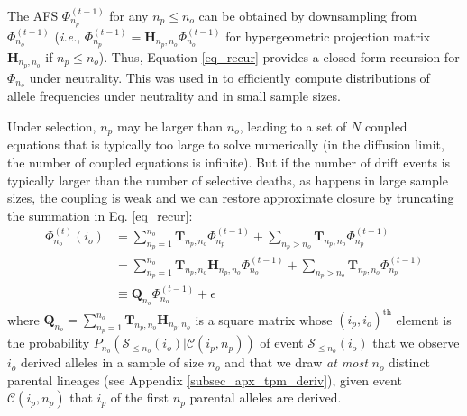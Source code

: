 \documentclass[review,nonatbib]{elsarticle}
\newcommand{\afs}[2]{\Phi_{#1}^{(#2)}}
\newcommand{\ms}{\mathcal{S}}
\begin{document}
The AFS  $\afs{n_p}{t-1}$ for any  $n_p\leq n_o$ can be obtained by downsampling from $\afs{n_o}{t-1}$ (\textit{i.e.}, $\afs{n_p}{t-1} =
\mathbf{H}_{n_p,n_o} \afs{n_o}{t-1}$ for hypergeometric projection matrix $\mathbf{H}_{n_p,n_o}$ if
$n_p\leq n_o$). Thus, Equation \eqref{eq_recur} provides a closed form recursion for $\Phi_{n_o}$ under neutrality. 
This was used in \cite{JouganousEtAl2017} to efficiently 
compute distributions of allele frequencies under neutrality and in small sample sizes.

Under selection, $n_{p}$ may be larger than $n_o$, leading to a set of $N$ coupled equations that is
typically too large to solve numerically (in the diffusion limit, the number of coupled equations is
infinite). But if the number of drift events is typically larger than the number of selective
deaths, as happens in large sample sizes, the coupling is weak and we can restore approximate
closure by truncating the summation in Eq. \ref{eq_recur}:
\begin{equation}
\begin{split}
  \afs{n_o}{t}(i_o)
  &= \sum_{n_p=1}^{n_{o}} \mathbf{T}_{n_p,n_o}  \afs{n_p}{t-1}+ \sum_{n_p> n_o }  \mathbf{T}_{n_p,n_o} \afs{n_p}{t-1} \\
  &=      \sum_{n_p=1}^{n_{o}} \mathbf{T}_{n_p,n_o} \mathbf{H}_{n_p,n_o} \afs{n_o}{t-1}+ \sum_{n_p> n_o }  \mathbf{T}_{n_p,n_o} \afs{n_p}{t-1} \\
  &\equiv \mathbf{Q}_{n_o}                                               \afs{n_o}{t-1}+ \epsilon
\end{split}
\label{eq_truncated}
\end{equation}
where $\mathbf{Q}_{n_o} =  \sum_{n_p=1}^{n_{o}} \mathbf{T}_{n_p,n_o} \mathbf{H}_{n_p,n_o}$ is a
square matrix whose $(i_p,i_o)^\text{th}$ element is the probability $P_{n_o}(\mathcal{S}_{\leq n_o}
(i_o)| \mathcal{C}(i_p,n_p))$ of event $\ms_{\leq n_o}(i_o)$ that we observe $i_o$ derived alleles
in a sample of size $n_o$ and that we draw \emph{at most} $n_o$ distinct parental lineages (see
Appendix \ref{subsec_apx_tpm_deriv}), given event $\mathcal{C}(i_p,n_p)$ that $i_p$ of the first
$n_p$ parental alleles are derived.  
\end{document}
